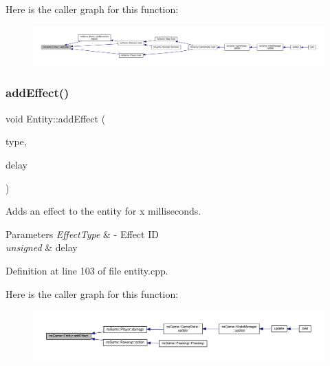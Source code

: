 Here is the caller graph for this function\+:\nopagebreak
\begin{figure}[H]
\begin{center}
\leavevmode
\includegraphics[width=350pt]{structns_game_1_1_entity_a0c574fba3e12b9bb976d72953626e550_icgraph}
\end{center}
\end{figure}
\mbox{\label{structns_game_1_1_entity_a0fbe0a80400a03319fbe3bd50919535c}} 
\subsubsection{\texorpdfstring{add\+Effect()}{addEffect()}}
{\footnotesize\ttfamily void Entity\+::add\+Effect (\begin{DoxyParamCaption}\item[{\hyperlink{namespacens_game_afea521dd2ba8e97be9549ce9936f4522}{Effect\+Type}}]{type,  }\item[{unsigned}]{delay }\end{DoxyParamCaption})}



Adds an effect to the entity for x milliseconds. 


\begin{DoxyParams}{Parameters}
{\em Effect\+Type} & -\/ Effect ID \\
\hline
{\em unsigned} & delay \\
\hline
\end{DoxyParams}


Definition at line 103 of file entity.\+cpp.

Here is the caller graph for this function\+:\nopagebreak
\begin{figure}[H]
\begin{center}
\leavevmode
\includegraphics[width=350pt]{structns_game_1_1_entity_a0fbe0a80400a03319fbe3bd50919535c_icgraph}
\end{center}
\end{figure}
\mbox{\label{structns_game_1_1_entity_ab5e14a11c0e89dce65f14366989a03b9}} 
